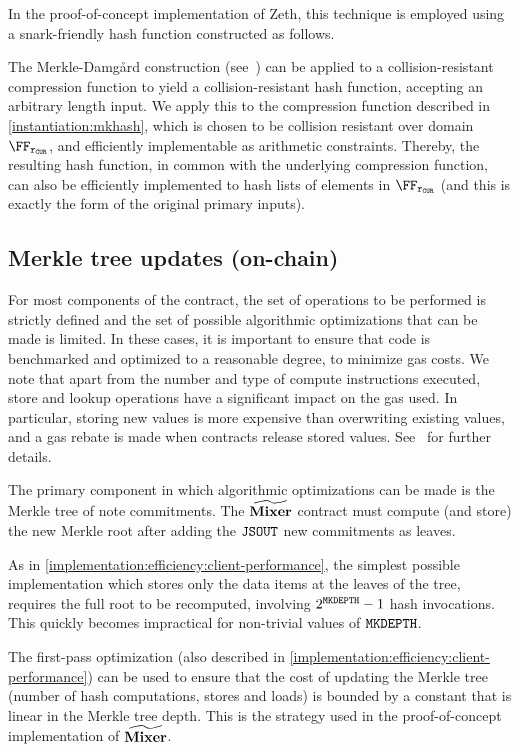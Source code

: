In the proof-of-concept implementation of Zeth, this technique is employed using a snark-friendly hash function constructed as follows.

The Merkle-Damgård construction (see~\cite[Chapter 9]{menezes1996handbook}) can be applied to a collision-resistant compression function to yield a collision-resistant hash function, accepting an arbitrary length input. We apply this to the compression function described in \cref{instantiation:mkhash}, which is chosen to be collision resistant over domain $\FFx{\rCURVE}$, and efficiently implementable as arithmetic constraints. Thereby, the resulting hash function, in common with the underlying compression function, can also be efficiently implemented to hash lists of elements in $\FFx{\rCURVE}$ (and this is exactly the form of the original primary inputs).

\subsection{Merkle tree updates (on-chain)}\label{implementation:efficiency:merkle-tree-on-chain}

For most components of the contract, the set of operations to be performed is strictly defined and the set of possible algorithmic optimizations that can be made is limited. In these cases, it is important to ensure that code is benchmarked and optimized to a reasonable degree, to minimize gas costs. We note that apart from the number and type of compute instructions executed, store and lookup operations have a significant impact on the gas used. In particular, storing new values is more expensive than overwriting existing values, and a gas rebate is made when contracts release stored values. See~\cite[Appendix H.1]{ethyellowpaper} for further details.

The primary component in which algorithmic optimizations can be made is the Merkle tree of note commitments. The $\widetilde{\mathbf{Mixer}}$ contract must compute (and store) the new Merkle root after adding the $\mathtt{JSOUT}$ new commitments as leaves.

As in \cref{implementation:efficiency:client-performance}, the simplest possible implementation which stores only the data items at the leaves of the tree, requires the full root to be recomputed, involving $2^{\mathtt{MKDEPTH}} - 1$ hash invocations. This quickly becomes impractical for non-trivial values of $\mathtt{MKDEPTH}$.

The first-pass optimization (also described in \cref{implementation:efficiency:client-performance}) can be used to ensure that the cost of updating the Merkle tree (number of hash computations, stores and loads) is bounded by a constant that is linear in the Merkle tree depth. This is the strategy used in the proof-of-concept implementation of $\widetilde{\mathbf{Mixer}}$.

